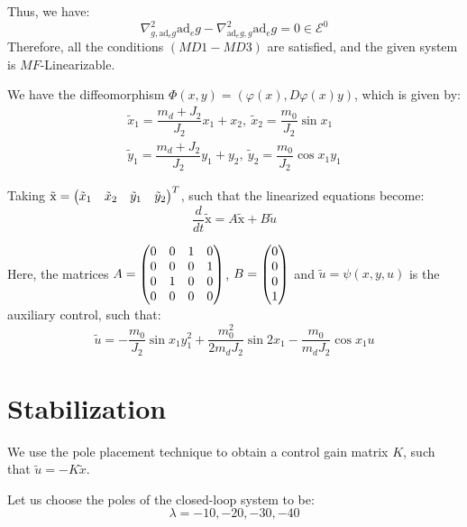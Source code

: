 Thus, we have:
\begin{equation}
    \nabla^2_{g, \text{ad}_e g} \text{ad}_e g - \nabla^2_{\text{ad}_e g, g} \text{ad}_e g = 0 \in \mathcal{E}^0
\end{equation}
Therefore, all the conditions $(MD1 - MD3)$ are satisfied, and the given system is $MF$-Linearizable.

We have the diffeomorphism $\Phi(x,y) = \left( \varphi(x), D\varphi(x)y\right)$, which is given by:
\begin{equation}
\begin{split}
        \tilde{x}_1  = \dfrac{m_d+J_2}{J_2}x_1 + x_2, \ 
        \tilde{x}_2  = \dfrac{m_0}{J_2}\sin{x_1} \\
        \tilde{y}_1  = \dfrac{m_d+J_2}{J_2}y_1 + y_2,\
        \tilde{y}_2  = \dfrac{m_0}{J_2}\cos{x_1}y_1
\end{split}
\end{equation}

Taking $\tilde{\text{x}} = \begin{pmatrix}\tilde{x}_1 & \tilde{x}_2 & \tilde{y}_1 & \tilde{y}_2 \end{pmatrix}^T$, such that the linearized equations become:
\begin{equation}
    \dfrac{d}{dt} \tilde{\text{x}}
    = A \tilde{\text{x}} + B \tilde{u}
\end{equation}

Here, the matrices $A = \begin{pmatrix} 0 & 0 & 1 & 0 \\ 0 & 0 & 0 & 1 \\ 0 & 1 & 0 & 0 \\ 0 & 0 & 0 & 0 \end{pmatrix}$, $B = \begin{pmatrix}0 \\ 0 \\ 0 \\ 1\end{pmatrix}$ and
$\tilde{u} = \psi (x, y, u)$ is the auxiliary control, such that:
\begin{equation}
    \tilde{u} = -\dfrac{m_0}{J_2} \sin{x_1}y_1^2 + \dfrac{m_0^2}{2m_dJ_2}\sin{2x_1} - \dfrac{m_0}{m_d J_2} \cos{x_1} u
\end{equation}


\section{Stabilization}
We use the pole placement technique to obtain a control gain matrix $K$, such that $\tilde{u} = - K \tilde{x}$.

Let us choose the poles of the closed-loop system to be:
\begin{equation}
    \lambda = -10, -20, -30, -40
\end{equation}

